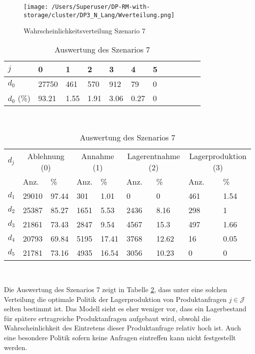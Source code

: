 \begin{figure}[h!]
  \begin{center}
    \texttt{[image: /Users/Superuser/DP-RM-with-storage/cluster/DP3\_N\_Lang/Wverteilung.png]}
    \caption{Wahrscheinlichkeitsverteilung Szenario 7}  \label{SB7}
  \end{center}
\end{figure}

\begin{table}[h!]
\renewcommand{\arraystretch}{1.5}
  \begin{center}
    \caption{Auswertung des Szenarios 7}  \label{AS7}
    \vspace*{3mm}
    \begin{tabular}{l l l l l l l l l l l l }  \hline 
         $j$ & 0 & 1  & 2 & 3 & 4  & 5   \\  \hline
$d_{0}$ &  27750 &  461 &  570 &  912 &  79 &  0 \\
$d_{0}$ (\%) &  93.21 &  1.55 &  1.91 &  3.06 &  0.27 &  0 \\
\hline
    \end{tabular} \\[3mm]
        \begin{tabular}{ l l l l l l l l l}   \hline    %
    $d_j$ & \multicolumn{2}{c}{Ablehnung (0)} & \multicolumn{2}{c}{Annahme (1)}  & \multicolumn{2}{c}{Lagerentnahme (2)} & \multicolumn{2}{c}{Lagerproduktion (3)}\\
    & Anz. & \% & Anz. & \% & Anz. & \% & Anz. & \% \\ \hline 
$d_{1}$ &  29010 &  97.44 &   301 &   1.01 &   0 &    0 &  461 &  1.54 \\
$d_{2}$ &  25387 &  85.27 &  1651 &   5.53 &  2436 &   8.16 &  298 &     1 \\
$d_{3}$ &  21861 &  73.43 &  2847 &   9.54 &  4567 &   15.3 &  497 &  1.66 \\
$d_{4}$ &  20793 &  69.84 &  5195 &  17.41 &  3768 &  12.62 &   16 &  0.05 \\
$d_{5}$ &  21781 &  73.16 &  4935 &  16.54 &  3056 &  10.23 &  0 &   0 \\
          \hline
   \end{tabular} \\[3mm]
     \end{center}
\end{table}

Die Auswertung des Szenarios 7 zeigt in Tabelle \ref{AS7}, dass unter eine solchen Verteilung die optimale Politik der Lagerproduktion von Produktanfragen $j\in\mathcal{J}$ selten bestimmt ist. Das Modell sieht es eher weniger vor, dass ein Lagerbestand für spätere ertragreiche Produktanfragen aufgebaut wird, obwohl die Wahrscheinlichkeit des Eintretens dieser Produktanfrage relativ hoch ist. Auch eine besondere Politik sofern keine Anfragen eintreffen kann nicht festgestellt werden.\\[10mm]

